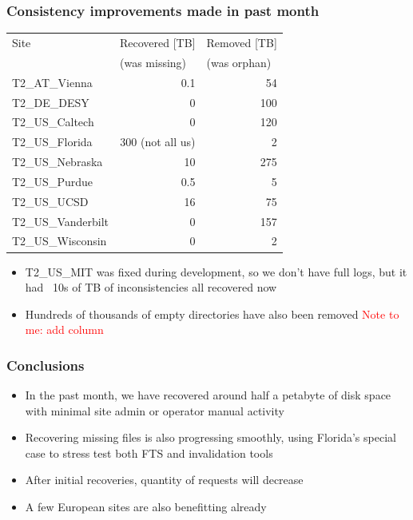 \documentclass{beamer}
\begin{document}
\begin{frame}
  \frametitle{Consistency improvements made in past month}

  \centering
  \begin{tabular}{l | r | r}
    \hline
    Site & \multicolumn{1}{l|}{Recovered [TB]} & \multicolumn{1}{l}{Removed [TB]} \\
    & \multicolumn{1}{l|}{(was missing)} & \multicolumn{1}{l}{(was orphan)} \\
    \hline
    T2\_AT\_Vienna & 0.1 & 54 \\
    T2\_DE\_DESY & 0 & 100 \\
    T2\_US\_Caltech & 0 & 120 \\
    \hline
    T2\_US\_Florida & 300 (not all us) & 2 \\
    T2\_US\_Nebraska & 10 & 275 \\
    T2\_US\_Purdue & 0.5 & 5 \\
    \hline
    T2\_US\_UCSD & 16 & 75 \\
    T2\_US\_Vanderbilt & 0 & 157 \\
    T2\_US\_Wisconsin & 0 & 2 \\
    \hline
  \end{tabular}


  \vspace{8pt}
  \begin{itemize}
  \item T2\_US\_MIT was fixed during development, so we don't have full logs,
    but it had ~10s of TB of inconsistencies all recovered now
  \item Hundreds of thousands of empty directories have also been removed
    \textcolor{red}{Note to me: add column}
  \end{itemize}

\end{frame}

\begin{frame}
  \frametitle{Conclusions}

  \begin{itemize}
  \item In the past month, we have recovered around half a petabyte of disk space
    with minimal site admin or operator manual activity
  \item Recovering missing files is also progressing smoothly,
    using Florida's special case to stress test both FTS and invalidation tools
  \item After initial recoveries, quantity of requests will decrease
  \item A few European sites are also benefitting already
  \end{itemize}

\end{frame}
\end{document}
